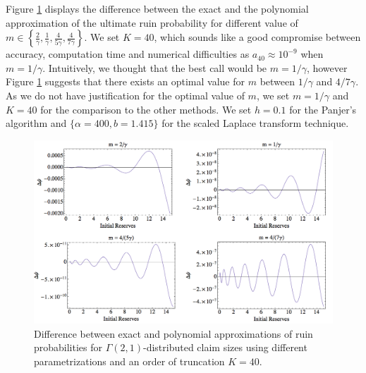 Figure \ref{Gamma2CaseDifferentParametrization} displays the difference between the exact and the polynomial approximation of the ultimate ruin probability for different value of $m\in\left\{\frac{2}{\gamma},\frac{1}{\gamma},\frac{4}{5\gamma},\frac{4}{7\gamma}\right\}$. We set $K=40$, which sounds like a good compromise between accuracy, computation time and numerical difficulties as $a_{40}\approx10^{-9}$ when $m=1/\gamma$.
Intuitively, we thought that the best call would be $m=1/\gamma$, however Figure \ref{Gamma2CaseDifferentParametrization} suggests that there exists an optimal value for $m$ between $1/\gamma$ and $4/7\gamma$. As we do not have justification for the optimal value of $m$, we set $m=1/\gamma$ and $K=40$ for the comparison to the other methods. We set $h=0.1$ for the Panjer's algorithm and $\{\alpha=400, b=1.415\}$ for the scaled Laplace transform technique.
\begin{center}
	\begin{figure}[!h]
		\begin{center}
			\includegraphics[width=16cm]{Chapitre4/GraphGamma2-1CasecomparisonParametrization.png}
			\caption{Difference between exact and polynomial approximations of ruin probabilities for $\Gamma(2,1)$-distributed claim sizes using different parametrizations and an order of truncation $K=40$.}\label{Gamma2CaseDifferentParametrization}
		\end{center}
	\end{figure}
\end{center}

